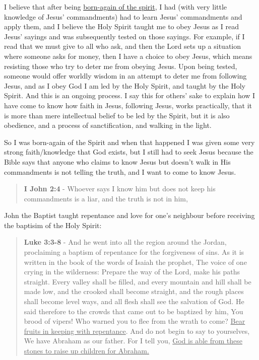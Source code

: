 \documentclass[11pt]{article}
\begin{document}
I believe that after being \href{https://web.archive.org/web/20220402091720/https://mullikine.github.io/posts/astral-projection/}{born-again of the spirit}, I had (with very little knowledge of Jesus' commandments) had to learn Jesus' commandments and apply them, and I believe the Holy Spirit taught me to obey Jesus as I read Jesus' sayings and was subsequently tested on those sayings. For example, if I read that we must give to all who ask, and then the Lord sets up a situation where someone asks for money, then I have a choice to obey Jesus, which means resisting those who try to deter me from obeying Jesus. Upon being tested, someone would offer worldly wisdom in an attempt to deter me from following Jesus, and as I obey God I am led by the Holy Spirit, and taught by the Holy Spirit. And this is an ongoing process. I say this for others' sake to explain how I have come to know how faith in Jesus, following Jesus, works practically, that it is more than mere intellectual belief to be led by the Spirit, but it is also obedience, and a process of sanctification, and walking in the light.

So I was born-again of the Spirit and when that happened I was given some very strong faith/knowledge that God exists, but I still had to seek Jesus because the Bible says that anyone who
claims to know Jesus but doesn't walk in His commandments is not telling the truth, and I want to come to know Jesus.

\begin{quote}
\textbf{I John 2:4} - Whoever says I know him but does not keep his commandments is a liar, and the truth is not in him,
\end{quote}

John the Baptist taught repentance and love for one's neighbour before receiving the baptisim of the Holy Spirit:

\begin{quote}
\textbf{Luke 3:3-8} - And he went into all the region around the Jordan, proclaiming a baptism of repentance for the forgiveness of sins. As it is written in the book of the words of Isaiah the prophet, The voice of one crying in the wilderness: Prepare the way of the Lord, make his paths straight. Every valley shall be filled, and every mountain and hill shall be made low, and the crooked shall become straight, and the rough places shall become level ways, and all flesh shall see the salvation of God. He said therefore to the crowds that came out to be baptized by him, You brood of vipers! Who warned you to flee from the wrath to come? \uline{Bear fruits in keeping with repentance}. And do not begin to say to yourselves, We have Abraham as our father. For I tell you, \uline{God is able from these stones to raise up children for Abraham.}
\end{quote}
\end{document}

